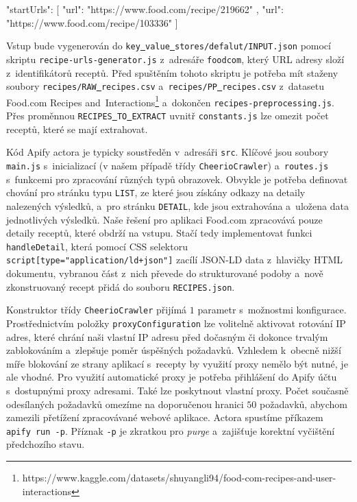 \begin{code}
{
  "startUrls": [
    {
      "url": "https://www.food.com/recipe/219662"
    },
    {
      "url": "https://www.food.com/recipe/103336"
    }
  ]
}
\end{code}

Vstup bude vygenerován do \texttt{key\underline{{ }}value\underline{{ }}stores/defalut/INPUT.json} pomocí skriptu \texttt{recipe-urls-generator.js} z~adresáře \texttt{foodcom}, který URL adresy složí z~identifikátorů receptů. Před spuštěním tohoto skriptu je potřeba mít staženy soubory \texttt{recipes/RAW\underline{{ }}recipes.csv} a~\texttt{recipes/PP\underline{{ }}recipes.csv} z~datasetu Food.com Recipes and~Interactions\footnote{https://www.kaggle.com/datasets/shuyangli94/food-com-recipes-and-user-interactions} a~dokončen \texttt{recipes-preprocessing.js}. Přes proměnnou \texttt{RECIPES\underline{{ }}TO\underline{{ }}EXTRACT} uvnitř \texttt{constants.js} lze omezit počet receptů, které se mají extrahovat.

Kód Apify actora je typicky soustředěn v~adresáři \texttt{src}. Klíčové jsou soubory \texttt{main.js} s~inicializací (v našem případě třídy \texttt{CheerioCrawler}) a~\texttt{routes.js} s~funkcemi pro zpracování různých typů obrazovek. Obvykle je potřeba definovat chování pro stránku typu \texttt{LIST}, ze které jsou získány odkazy na detaily nalezených výsledků, a~pro stránku \texttt{DETAIL}, kde jsou extrahována a~uložena data jednotlivých výsledků. Naše řešení pro aplikaci Food.com zpracovává pouze detaily receptů, které obdrží na vstupu. Stačí tedy implementovat funkci \texttt{handleDetail}, která pomocí CSS selektoru \texttt{script[type="application/ld+json"]} zacílí JSON-LD data z~hlavičky HTML dokumentu, vybranou část z~nich převede do strukturované podoby a~nově zkonstruovaný recept přidá do souboru \texttt{RECIPES.json}.

Konstruktor třídy \texttt{CheerioCrawler} přijímá $1$ parametr s~možnostmi konfigurace. Prostřednictvím položky \texttt{proxyConfiguration} lze volitelně aktivovat rotování IP adres, které chrání naši vlastní IP adresu před dočasným či dokonce trvalým zablokováním a~zlepšuje poměr úspěšných požadavků. Vzhledem k~obecně nižší míře blokování ze strany aplikací s~recepty by využití proxy nemělo být nutné, je ale vhodné. Pro využití automatické proxy je potřeba přihlášení do Apify účtu s~dostupnými proxy adresami. Také lze poskytnout vlastní proxy. Počet současně odesílaných požadavků omezíme na doporučenou hranici $50$ požadavků, abychom zamezili přetížení zpracovávané webové aplikace. Actora spustíme příkazem \texttt{apify\,run\,-p}. Příznak \texttt{-p} je zkratkou pro \emph{purge} a~zajišťuje korektní vyčištění předchozího stavu.

